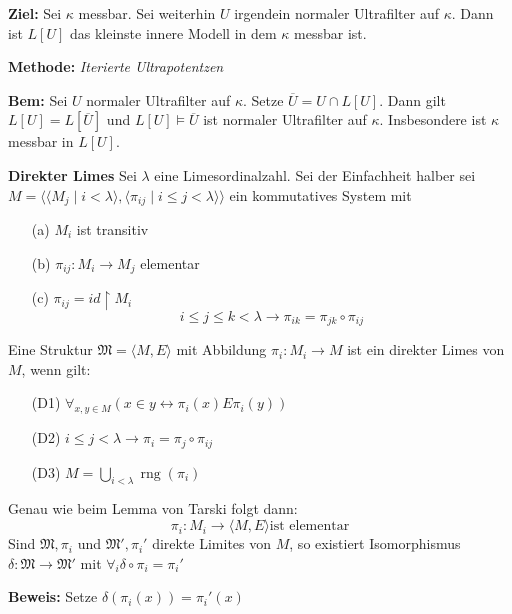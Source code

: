 \documentclass[a4paper,fontsize=11pt]{scrartcl}
\newcommand{\rng}{\operatorname{rng}}
\renewcommand{\bar}[1]{\overline{#1}}
\begin{document}
{\bf Ziel:} Sei $\kappa$ messbar.
	Sei weiterhin $U$ irgendein normaler Ultrafilter auf $\kappa$. %
	Dann ist $L[U]$ das kleinste innere Modell in dem $\kappa$ messbar ist.

	{\bf Methode:} {\em Iterierte Ultrapotentzen}

{\bf Bem:} Sei $U$ normaler Ultrafilter auf $\kappa$.
	Setze $\bar U=U\cap L[U]$.
	Dann gilt $L[U]=L[\bar U]$ und $L[U]\models\bar U$ ist normaler Ultrafilter auf $\kappa$.
	Insbesondere ist $\kappa$ messbar in $L[U]$.

{\bf Direkter Limes}
	Sei $\lambda$ eine Limesordinalzahl.
	Sei der Einfachheit halber sei $M=\langle\langle M_j\mid i<\lambda\rangle, \langle \pi_{ij}\mid i\le j<\lambda\rangle\rangle$ ein kommutatives System mit
	\begin{itemize}
		\item[(a)] $M_i$ ist transitiv
		\item[(b)] $\pi_{ij}\colon M_i\to M_j$ elementar
		\item[(c)] $\pi_{ij}=id\upharpoonright M_i$
		\[i\le j\le k<\lambda\to \pi_{ik} =\pi_{jk} \circ \pi_{ij} \]
	\end{itemize}
	Eine Struktur $\mathfrak M=\langle M,E\rangle$ mit Abbildung $\pi_i\colon M_i\to M$ ist ein direkter Limes von $M$, wenn gilt:
	\begin{itemize}
		\item[(D1)] $\forall_{x,y\in M} (x\in y\leftrightarrow \pi_i(x)E\pi_i(y))$
		\item[(D2)] $i\le j<\lambda\to \pi_i=\pi_j\circ\pi_{ij}$
		\item[(D3)] $M=\bigcup_{i<\lambda} \rng(\pi_i)$
	\end{itemize}
	Genau wie beim Lemma von Tarski folgt dann:
	\[\pi_i\colon M_i\to\langle M, E\rangle \mbox{ist elementar}\]
	Sind $\mathfrak M, \pi_i$ und $\mathfrak M', \pi_i'$ direkte Limites von $M$, so existiert Isomorphismus $\delta\colon \mathfrak M\to\mathfrak M'$
	mit $\forall_i \delta\circ\pi_i=\pi_i'$

	{\bf Beweis:} Setze $\delta(\pi_i(x))=\pi_i'(x)$
\end{document}
